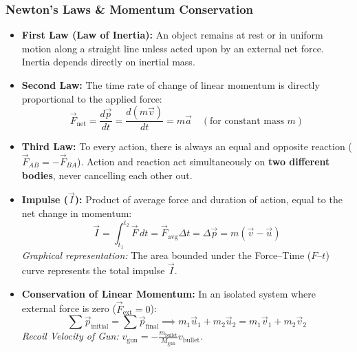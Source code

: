 \documentclass[11pt,a4paper]{article}
\begin{document}
\subsubsection{Newton's Laws \& Momentum Conservation}
\begin{itemize}[leftmargin=1.5em, itemsep=2pt]
  \item \textbf{First Law (Law of Inertia):} An object remains at rest or in uniform motion along a straight line unless acted upon by an external net force. Inertia depends directly on inertial mass.
  \item \textbf{Second Law:} The time rate of change of linear momentum is directly proportional to the applied force:
  \[
    \vec{F}_{\text{net}} = \frac{d\vec{p}}{dt} = \frac{d(m\vec{v})}{dt} = m\vec{a} \quad (\text{for constant mass } m)
  \]
  \item \textbf{Third Law:} To every action, there is always an equal and opposite reaction ($\vec{F}_{AB} = -\vec{F}_{BA}$). Action and reaction act simultaneously on \textbf{two different bodies}, never cancelling each other out.
  \item \textbf{Impulse ($\vec{I}$):} Product of average force and duration of action, equal to the net change in momentum:
  \[
    \vec{I} = \int_{t_1}^{t_2} \vec{F} \, dt = \vec{F}_{\text{avg}} \Delta t = \Delta \vec{p} = m(\vec{v} - \vec{u})
  \]
  \textit{Graphical representation:} The area bounded under the Force--Time ($F$--$t$) curve represents the total impulse $\vec{I}$.
  \item \textbf{Conservation of Linear Momentum:} In an isolated system where external force is zero ($\vec{F}_{\text{ext}} = 0$):
  \[
    \sum \vec{p}_{\text{initial}} = \sum \vec{p}_{\text{final}} \implies m_1\vec{u}_1 + m_2\vec{u}_2 = m_1\vec{v}_1 + m_2\vec{v}_2
  \]
  \textit{Recoil Velocity of Gun:} $v_{\text{gun}} = -\frac{m_{\text{bullet}}}{M_{\text{gun}}} v_{\text{bullet}}$.
\end{itemize}
\end{document}
